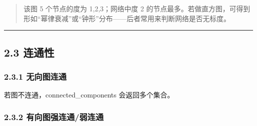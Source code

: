 \begin{quote}
该图 5 个节点的度为 1,2,3；网络中度 2
的节点最多。若做直方图，可得到形如``幂律衰减''或``钟形''分布------后者常用来判断网络是否无标度。
\end{quote}

\begin{center}\rule{0.5\linewidth}{0.5pt}\end{center}

\subsection{2.3 连通性}\label{ux8fdeux901aux6027}

\subsubsection{2.3.1 无向图连通}\label{ux65e0ux5411ux56feux8fdeux901a}

\begin{Shaded}
\begin{Highlighting}[]
\NormalTok{(}
\NormalTok{(}\NormalTok{, }
\end{Highlighting}
\end{Shaded}

\begin{Shaded}
\begin{Highlighting}[]
\end{Highlighting}
\end{Shaded}

若图不连通，connected\_components 会返回多个集合。

\subsubsection{2.3.2
有向图强连通/弱连通}\label{ux6709ux5411ux56feux5f3aux8fdeux901aux5f31ux8fdeux901a}

\begin{Shaded}
\begin{Highlighting}[]
\OperatorTok{=}
\NormalTok{(}
\NormalTok{(}
\end{Highlighting}
\end{Shaded}

